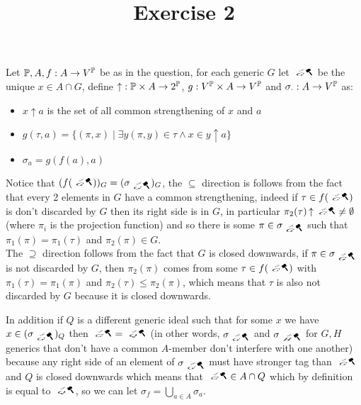 


\title{Exercise 2}

\maketitle
\begin{cExercise}[][][author]
	Let $\Bbb P, A, f:A\to V^\Bbb P$ be as in the question, for each generic $G$ let $\bonk{G}$ be the unique $x\in A\cap G$, define $\operatorname{\uparrow}:\Bbb P\times A\to 2^\Bbb P$, $g:V^\Bbb P\times A\to V^\Bbb P$ and $\sigma_\cdot:A\to V^\P$ as:
	
	\begin{itemize}
		\item $x\operatorname{\uparrow}a$ is the set of all common strengthening of $x$ and $a$
		\item $g(\tau, a)=\{(\pi, x)\mid\exists y (\pi, y)\in \tau\land x\in y\operatorname{\uparrow}a\}$
		\item $\sigma_a=g(f(a),a)$
	\end{itemize}
	
	Notice that $(f(\bonk{G}))_G=(\sigma_{\bonk{G}})_G$, the $\subseteq$ direction is follows from the fact that every 2 elements in $G$ have a common strengthening, indeed if $\tau\in f(\bonk{G})$ is don't discarded by $G$ then its right side is in $G$, in particular $\pi_2(\tau)\operatorname{\uparrow}\bonk{G}\ne \emptyset$ (where $\pi_i$ is the projection function) and so there is some $\pi\in \sigma_{\bonk{G}}$ such that $\pi_1(\pi)=\pi_1(\tau)$ and $\pi_2(\pi)\in G$.\\
	The $\supseteq$ direction follows from the fact that $G$ is closed downwards, if $\pi\in \sigma_{\bonk{G}}$ is not discarded by $G$, then $\pi_2(\pi)$ comes from some $\tau\in f(\bonk{G})$ with $\pi_1(\tau)=\pi_1(\pi)$ and $\pi_2(\tau)\le\pi_2(\pi)$, which means that $\tau$ is also not discarded by $G$ because it is closed downwards.
	
	In addition if $Q$ is a different generic ideal such that for some $x$ we have $x\in (\sigma_{\bonk{G}})_Q$ then $\bonk{G}=\bonk{Q}$ (in other words, $\sigma_{\bonk{G}}$ and $\sigma_{\bonk{H}}$ for $G,H$ generics that don't have a common $A$-member don't interfere with one another) because any right side  of an element of $\sigma_{\bonk{G}}$ must have stronger tag than $\bonk{G}$ and $Q$ is closed downwards which means that $\bonk{G}\in A\cap Q$ which by definition is equal to $\bonk{Q}$, so we can let $\sigma_f=\bigcup_{a\in A}\sigma_a$.
\end{cExercise}
